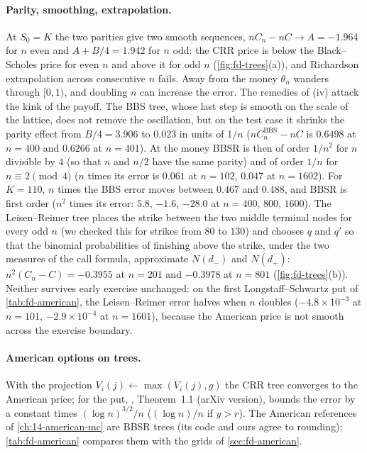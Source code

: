 \paragraph{Parity, smoothing, extrapolation.} At $S_0=K$ the two parities give two smooth
sequences, $nC_n-nC\to A=-1.964$ for $n$ even and $A+B/4=1.942$ for $n$ odd: the CRR price is below the
Black--Scholes price for even $n$ and above it for odd $n$ (\cref{fig:fd-trees}(a)), and
Richardson extrapolation across consecutive $n$ fails. Away from the money $\theta_n$ wanders
through $[0,1)$, and doubling $n$ can increase the error. The remedies of (iv) attack the kink of
the payoff. The BBS tree, whose last step is smooth on the scale of the lattice, does not remove
the oscillation, but on the test case it shrinks the parity effect
from $B/4=3.906$ to $0.023$ in units of $1/n$ ($nC^{\mathrm{BBS}}_n-nC$ is $0.6498$ at $n=400$ and
$0.6266$ at $n=401$). At the money BBSR is then of order $1/n^2$ for $n$ divisible by $4$ (so that $n$
and $n/2$ have the same parity) and of order $1/n$ for $n\equiv2\pmod4$ ($n$ times its error is $0.061$
at $n=102$, $0.047$ at $n=1602$). For $K=110$, $n$ times the BBS error moves between $0.467$ and $0.488$,
and BBSR is first order ($n^2$ times its error: $5.8$, $-1.6$, $-28.0$ at $n=400$, $800$, $1600$). The Leisen--Reimer tree places the strike between
the two middle terminal nodes for every odd $n$ (we checked this for strikes from $80$ to $130$)
and chooses $q$ and $q'$ so that the binomial probabilities of finishing above the strike, under
the two measures of the call formula, approximate $N(d_-)$ and $N(d_+)$: $n^2(C_n-C)=-0.3955$ at
$n=201$ and $-0.3978$ at $n=801$ (\cref{fig:fd-trees}(b)). Neither survives early exercise
unchanged: on the first Longstaff--Schwartz put of \cref{tab:fd-american}, the Leisen--Reimer error
halves when $n$ doubles ($-4.8\times10^{-3}$ at $n=101$, $-2.9\times10^{-4}$ at $n=1601$), because the American
price is not smooth across the exercise boundary.

\paragraph{American options on trees.} With the projection $V_i(j)\leftarrow\max(V_i(j),g)$ the
CRR tree converges to the American price; for the put, \textcite{lamberton-2018}, Theorem~1.1 (arXiv version),
bounds the error by a constant times $(\log n)^{3/2}/n$ ($(\log n)/n$ if $y>r$). The American
references of \cref{ch:14-american-mc} are BBSR trees (its code and ours agree to rounding);
\cref{tab:fd-american} compares them with the grids of \cref{sec:fd-american}.

